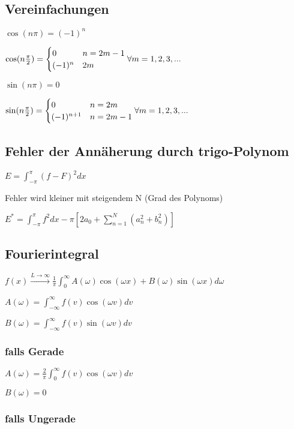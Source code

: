 \documentclass[10pt,a4paper]{scrartcl}
\begin{document}
\begin{multicols*}{3}
	\subsection{Vereinfachungen}
	
	$\cos(n\pi) = (-1)^n$
	
	$\cos(n\frac{\pi}{2})=
	\begin{cases}
	0&n = 2m-1\\
	(-1)^n&2m
	\end{cases}
	\hfill\forall m=1,2,3,...$
	 
	$\sin(n\pi)=0$
	
	$\sin(n\frac{\pi}{2})=
	\begin{cases}
	0&n=2m\\
	(-1)^{n+1}&n=2m-1
	\end{cases}
	\hfill\forall m=1,2,3,...$
	
	\subsection{Fehler der Annäherung durch trigo-Polynom}
	
	$E=\int_{-\pi}^\pi{(f-F)^2dx}$

	 
	
	Fehler wird kleiner mit steigendem N (Grad des Polynoms)
	
	$E^*=\int_{-\pi}^\pi{f^2dx}-\pi[2a_0+\sum_{n=1}^N{(a_n^2+b_n^2)}]$
	
	
	\subsection{Fourierintegral}
	$f(x)\xrightarrow{L\to\infty}\frac{1}{\pi}\int_0^\infty{A(\omega)\cos(\omega x)+B(\omega)\sin(\omega x)d\omega}$
	
	$A(\omega)=\int_{-\infty}^{\infty}{f(v)\cos(\omega v)dv}$
	
	$B(\omega)=\int_{-\infty}^{\infty}{f(v)\sin(\omega v)dv}$
	
	\subsubsection{falls Gerade}
	
	$A(\omega)=\frac{2}{\pi}\int_0^\infty{f(v)\cos(\omega v)dv}$
	
	$B(\omega)=0$
	
	\subsubsection{falls Ungerade}
		

\end{multicols*}
\end{document}

